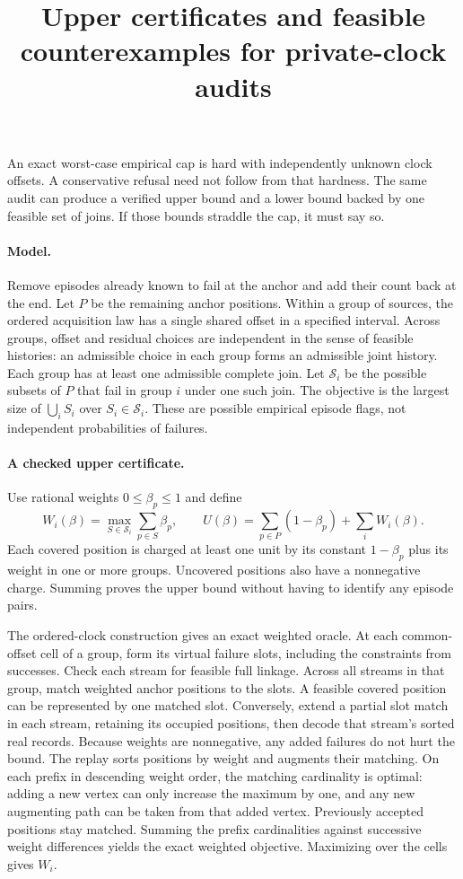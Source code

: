\documentclass[11pt]{article}
\title{Upper certificates and feasible counterexamples for private-clock audits}
\begin{document}
\maketitle

An exact worst-case empirical cap is hard with independently unknown
clock offsets. A conservative refusal need not follow from that
hardness. The same audit can produce a verified upper bound and a
lower bound backed by one feasible set of joins. If those bounds
straddle the cap, it must say so.

\paragraph{Model.}
Remove episodes already known to fail at the anchor and add their
count back at the end. Let \(P\) be the remaining anchor positions.
Within a group of sources, the ordered acquisition law has a single
shared offset in a specified interval. Across groups, offset and
residual choices are independent in the sense of feasible histories:
an admissible choice in each group forms an admissible joint history.
Each group has at least one admissible complete join. Let
\(\mathcal S_i\) be the possible subsets of \(P\) that fail in group
\(i\) under one such join. The objective is the largest size of
\(\bigcup_i S_i\) over \(S_i\in\mathcal S_i\). These are possible
empirical episode flags, not independent probabilities of failures.

\paragraph{A checked upper certificate.}
Use rational weights \(0\le\beta_p\le1\) and define
\[
 W_i(\beta)=\max_{S\in\mathcal S_i}\sum_{p\in S}\beta_p,\qquad
 U(\beta)=\sum_{p\in P}(1-\beta_p)+\sum_i W_i(\beta).
\]
Each covered position is charged at least one unit by its constant
\(1-\beta_p\) plus its weight in one or more groups. Uncovered positions
also have a nonnegative charge. Summing proves the upper bound without
having to identify any episode pairs.

The ordered-clock construction gives an exact weighted oracle.
At each common-offset cell of a group, form its virtual failure
slots, including the constraints from successes. Check each stream
for feasible full linkage. Across all streams in that group, match
weighted anchor positions to the slots. A feasible covered position
can be represented by one matched slot. Conversely, extend a partial
slot match in each stream, retaining its occupied positions, then
decode that stream's sorted real records. Because weights are
nonnegative, any added failures do not hurt the bound.
The replay sorts positions by weight and augments their matching.
On each prefix in descending weight order, the matching cardinality
is optimal: adding a new vertex can only increase the maximum by one,
and any new augmenting path can be taken from that added vertex.
Previously accepted positions stay matched. Summing the prefix
cardinalities against successive weight differences yields the exact
weighted objective. Maximizing over the cells gives \(W_i\).
\end{document}
